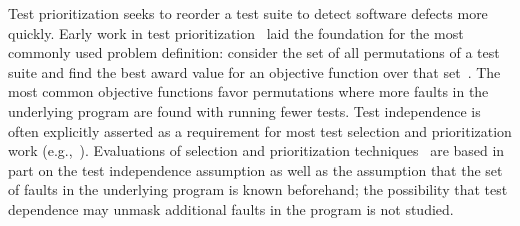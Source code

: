 Test prioritization seeks to reorder a test suite to detect
software defects more quickly. 
Early work in test
prioritization~\cite{Wong:1997:SER:851010.856115,Rothermel:1999:TCP:519621.853398}
laid the foundation for the most commonly used problem definition:
consider the set of all permutations of a test suite and find the best
award value for an objective function over that
set~\cite{Elbaum:2000:PTC:347324.348910}.  The most common objective
functions favor permutations where more faults in the underlying
program  are found with running fewer tests.
Test independence is often explicitly asserted as a
requirement for most test selection and prioritization work (e.g.,~\cite[p.~1500]{Rummel:2005:TPR:1066677.1067016}).
Evaluations of selection and prioritization techniques~\cite[\emph{et alia}]{Rothermel:1999:TCP:519621.853398,Do:2010:ETC:1907658.1908088}
are based in part on the test independence
assumption as well as the assumption that the set of faults in the underlying
program is known beforehand; the possibility that test dependence may unmask additional faults in the program is not studied.


